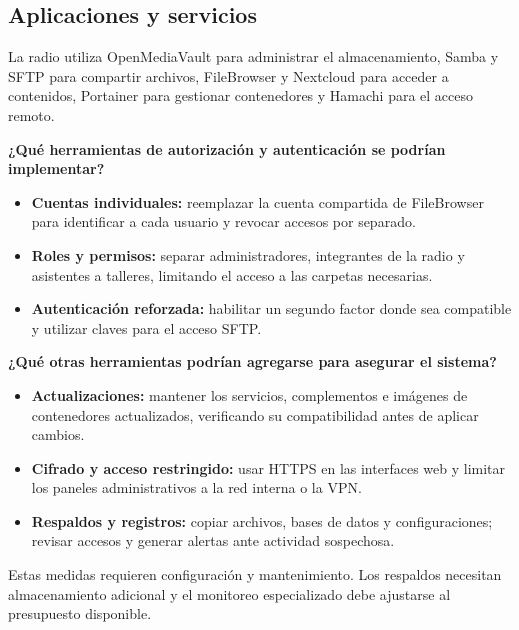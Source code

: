 \documentclass[12pt,a4paper]{article}
\begin{document}
\clearpage
\subsection{Aplicaciones y servicios}
La radio utiliza OpenMediaVault para administrar el almacenamiento, Samba y SFTP para compartir archivos, FileBrowser y Nextcloud para acceder a contenidos, Portainer para gestionar contenedores y Hamachi para el acceso remoto.

\par\textbf{¿Qué herramientas de autorización y autenticación se podrían implementar?}
\begin{itemize}[itemsep=3pt]
    \item \textbf{Cuentas individuales:} reemplazar la cuenta compartida de FileBrowser para identificar a cada usuario y revocar accesos por separado.
    \item \textbf{Roles y permisos:} separar administradores, integrantes de la radio y asistentes a talleres, limitando el acceso a las carpetas necesarias.
    \item \textbf{Autenticación reforzada:} habilitar un segundo factor donde sea compatible y utilizar claves para el acceso SFTP.
\end{itemize}

\par\textbf{¿Qué otras herramientas podrían agregarse para asegurar el sistema?}
\begin{itemize}[itemsep=3pt]
    \item \textbf{Actualizaciones:} mantener los servicios, complementos e imágenes de contenedores actualizados, verificando su compatibilidad antes de aplicar cambios.
    \item \textbf{Cifrado y acceso restringido:} usar HTTPS en las interfaces web y limitar los paneles administrativos a la red interna o la VPN.
    \item \textbf{Respaldos y registros:} copiar archivos, bases de datos y configuraciones; revisar accesos y generar alertas ante actividad sospechosa.
\end{itemize}
Estas medidas requieren configuración y mantenimiento. Los respaldos necesitan almacenamiento adicional y el monitoreo especializado debe ajustarse al presupuesto disponible.
\end{document}
